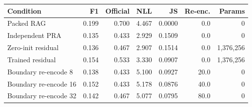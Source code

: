 \begin{tabular}{lrrrrrr}
\toprule
Condition & F1 & Official & NLL & JS & Re-enc. & Params \\
\midrule
Packed RAG & 0.199 & 0.700 & 4.467 & 0.0000 & 0.0 & 0 \\
Independent PRA & 0.135 & 0.433 & 2.929 & 0.1509 & 0.0 & 0 \\
Zero-init residual & 0.136 & 0.467 & 2.907 & 0.1514 & 0.0 & 1,376,256 \\
Trained residual & 0.154 & 0.533 & 3.330 & 0.0907 & 0.0 & 1,376,256 \\
Boundary re-encode 8 & 0.138 & 0.433 & 5.100 & 0.0927 & 20.0 & 0 \\
Boundary re-encode 16 & 0.152 & 0.433 & 5.178 & 0.0876 & 40.0 & 0 \\
Boundary re-encode 32 & 0.142 & 0.467 & 5.077 & 0.0795 & 80.0 & 0 \\
\bottomrule
\end{tabular}

